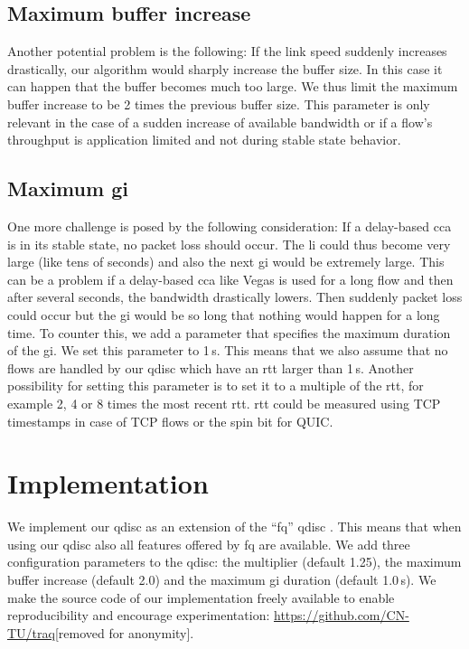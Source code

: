 \documentclass[10pt,sigconf,letterpaper,dvipsnames\ifx\removeHeaders\tempYes ,nonacm\fi\ifx\removeHeaders\tempNo ,anonymous\fi]{acmart}
\begin{document}
\subsection{Maximum buffer increase}

Another potential problem is the following: If the link speed suddenly increases drastically, our algorithm would sharply increase the buffer size. In this case it can happen that the buffer becomes much too large. We thus limit the maximum buffer increase to be 2 times the previous buffer size. This parameter is only relevant in the case of a sudden increase of available bandwidth or if a flow's throughput is application limited and not during stable state behavior. 

\subsection{Maximum \gls{gi}}

One more challenge is posed by the following consideration: If a delay-based \gls{cca} is in its stable state, no packet loss should occur. The \gls{li} could thus become very large (like tens of seconds) and also the next \gls{gi} would be extremely large. This can be a problem if a delay-based \gls{cca} like Vegas \cite{brakmo_tcp_1995} is used for a long flow and then after several seconds, the bandwidth drastically lowers. Then suddenly packet loss could occur but the \gls{gi} would be so long that nothing would happen for a long time. To counter this, we add a parameter that specifies the maximum duration of the \gls{gi}. We set this parameter to 1\,s. This means that we also assume that no flows are handled by our \gls{qdisc} which have an \gls{rtt} larger than 1\,s. Another possibility for setting this parameter is to set it to a multiple of the \gls{rtt}, for example 2, 4 or 8 times the most recent \gls{rtt}. \gls{rtt} could be measured using TCP timestamps \cite{borman_tcp_2014} in case of TCP flows or the spin bit \cite{kuhlewind_quic_2018} for QUIC. 

\section{Implementation}

We implement our \gls{qdisc} as an extension of the ``fq'' \gls{qdisc} \cite{dumazet_pkt_sched:_2013}. This means that when using our \gls{qdisc} also all features offered by fq are available. We add three configuration parameters to the \gls{qdisc}: the multiplier (default 1.25), the maximum buffer increase (default 2.0) and the maximum \gls{gi} duration (default 1.0\,s). We make the source code of our implementation freely available to enable reproducibility and encourage experimentation: \ifx\removeHeaders\tempYes\url{https://github.com/CN-TU/traq}\else{}[removed for anonymity]\fi .
\end{document}
